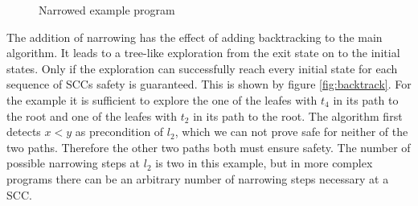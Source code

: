\begin{figure}
\centering
{}
\caption{Narrowed example program}
\label{fig:narrowed}
\end{figure}

The addition of narrowing has the effect of adding backtracking to the main algorithm.
It leads to a tree-like exploration from the exit state on to the initial states.
Only if the exploration can successfully reach every initial state for each sequence of SCCs safety is guaranteed.
This is shown by figure \ref{fig:backtrack}.
For the example it is sufficient to explore the one of the leafes with $t_4$ in its path to the root and one of the leafes with $t_2$ in its path to the root.
The algorithm first detects $x < y$ as precondition of $l_2$, which we can not prove safe for neither of the two paths.
Therefore the other two paths both must ensure safety.
The number of possible narrowing steps at $l_2$ is two in this example, but in more complex programs there can be an arbitrary number of narrowing steps necessary at a SCC.

